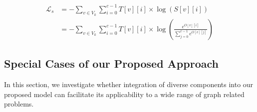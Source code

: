 \vspace{-.2cm}
\begin{equation}
\begin{split}
\mathcal{L}_s &= -\sum_{v\in V_k}\sum_{i=0}^{c-1}T[v][i]\times\log (S[v][i])\\
&= -\sum_{v\in V_k}\sum_{i=0}^{c-1}T[v][i]\times\log\left(\frac{e^{O[v][i]}}{\sum_{j=0}^{c-1}e^{O[v][j]}}\right)
\end{split}
\label{eqn:sup_loss}
\end{equation}




\subsection{Special Cases of our Proposed Approach}
\label{sec:SpecialCases}
In this section, we investigate whether integration of diverse components into our proposed model can facilitate its applicability to a wide range of graph related problems.
